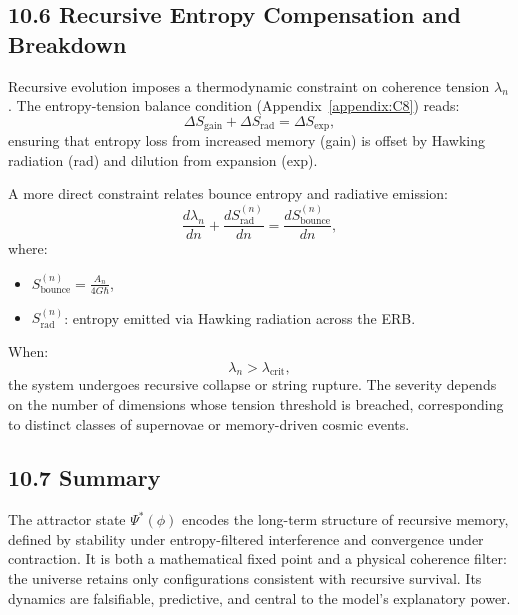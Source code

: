 \subsection{10.6 Recursive Entropy Compensation and Breakdown}

Recursive evolution imposes a thermodynamic constraint on coherence tension \( \lambda_n \). The entropy-tension balance condition (Appendix~\ref{appendix:C8}) reads:
\[
\Delta S_{\text{gain}} + \Delta S_{\text{rad}} = \Delta S_{\text{exp}},
\]
ensuring that entropy loss from increased memory (gain) is offset by Hawking radiation (rad) and dilution from expansion (exp).

A more direct constraint relates bounce entropy and radiative emission:
\[
\frac{d\lambda_n}{dn} + \frac{dS_{\text{rad}}^{(n)}}{dn} = \frac{dS_{\text{bounce}}^{(n)}}{dn},
\]
where:
\begin{itemize}
    \item \( S_{\text{bounce}}^{(n)} = \frac{A_n}{4G\hbar} \),
    \item \( S_{\text{rad}}^{(n)} \): entropy emitted via Hawking radiation across the ERB.
\end{itemize}

When:
\[
\lambda_n > \lambda_{\text{crit}},
\]
the system undergoes recursive collapse or string rupture. The severity depends on the number of dimensions whose tension threshold is breached, corresponding to distinct classes of supernovae or memory-driven cosmic events.

\subsection{10.7 Summary}

The attractor state \( \Psi^*(\phi) \) encodes the long-term structure of recursive memory, defined by stability under entropy-filtered interference and convergence under contraction. It is both a mathematical fixed point and a physical coherence filter: the universe retains only configurations consistent with recursive survival. Its dynamics are falsifiable, predictive, and central to the model’s explanatory power.
